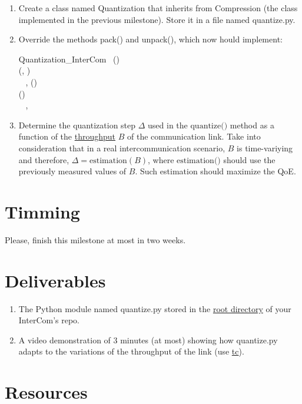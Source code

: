 \begin{enumerate}
\item Create a class named Quantization that inherits from
  Compression (the class implemented in the previous
  milestone). Store it in a file named quantize.py.
  
\item Override the methods pack() and unpack(),
  which now hould implement:

\begin{pseudocode}{Quantization\_InterCom}{~}
  \BEGIN
     \GETS {}()\\
     \GETS {}(, )\\
    ~ 
  \END
  \ENDPROCEDURE
  \BEGIN
    ,  \GETS {}()\\
     \GETS {}()\\
    ~ , 
  \END
  \ENDPROCEDURE
\end{pseudocode}

\item Determine the quantization step $\Delta$ used in the
  $\text{quantize()}$ method as a function of the
  \href{https://en.wikipedia.org/wiki/Throughput}{throughput} $B$ of
  the communication link. Take into consideration that in a real
  intercommunication scenario, $B$ is time-variying and therefore,
  $\Delta = \text{estimation}(B)$, where $\text{estimation()}$
  should use the previously measured values of $B$. Such estimation
  should maximize the QoE.
\end{enumerate}

\section{Timming}

Please, finish this milestone at most in two weeks.

\section{Deliverables}

\begin{enumerate}
  \item The Python module named quantize.py stored in the
    \href{https://github.com/Tecnologias-multimedia/intercom}{root
      directory} of your InterCom's repo.  \item A video demonstration
    of 3 minutes (at most) showing how quantize.py adapts to the
    variations of the throughput of the link (use
    \href{https://man7.org/linux/man-pages/man8/tc.8.html}{tc}).
\end{enumerate}

\section{Resources}


